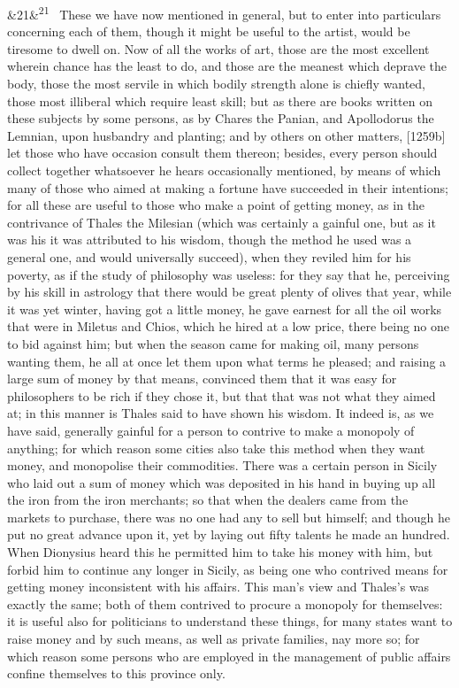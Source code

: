 \documentclass[12pt]{article}
\newcommand{\para}[1][]{\par\noindent\ifx&#1&\else\textsuperscript{\footnotesize #1}~\fi}
\begin{document}
\para[21] These we have now mentioned in general, but to enter into particulars concerning each of them, though it might be useful to the artist, would be tiresome to dwell on. Now of all the works of art, those are the most excellent wherein chance has the least to do, and those are the meanest which deprave the body, those the most servile in which bodily strength alone is chiefly wanted, those most illiberal which require least skill; but as there are books written on these subjects by some persons, as by Chares the Panian, and Apollodorus the Lemnian, upon husbandry and planting; and by others on other matters, [1259b] let those who have occasion consult them thereon; besides, every person should collect together whatsoever he hears occasionally mentioned, by means of which many of those who aimed at making a fortune have succeeded in their intentions; for all these are useful to those who make a point of getting money, as in the contrivance of Thales the Milesian (which was certainly a gainful one, but as it was his it was attributed to his wisdom, though the method he used was a general one, and would universally succeed), when they reviled him for his poverty, as if the study of philosophy was useless: for they say that he, perceiving by his skill in astrology that there would be great plenty of olives that year, while it was yet winter, having got a little money, he gave earnest for all the oil works that were in Miletus and Chios, which he hired at a low price, there being no one to bid against him; but when the season came for making oil, many persons wanting them, he all at once let them upon what terms he pleased; and raising a large sum of money by that means, convinced them that it was easy for philosophers to be rich if they chose it, but that that was not what they aimed at; in this manner is Thales said to have shown his wisdom. It indeed is, as we have said, generally gainful for a person to contrive to make a monopoly of anything; for which reason some cities also take this method when they want money, and monopolise their commodities. There was a certain person in Sicily who laid out a sum of money which was deposited in his hand in buying up all the iron from the iron merchants; so that when the dealers came from the markets to purchase, there was no one had any to sell but himself; and though he put no great advance upon it, yet by laying out fifty talents he made an hundred. When Dionysius heard this he permitted him to take his money with him, but forbid him to continue any longer in Sicily, as being one who contrived means for getting money inconsistent with his affairs. This man's view and Thales's was exactly the same; both of them contrived to procure a monopoly for themselves: it is useful also for politicians to understand these things, for many states want to raise money and by such means, as well as private families, nay more so; for which reason some persons who are employed in the management of public affairs confine themselves to this province only.
\end{document}
